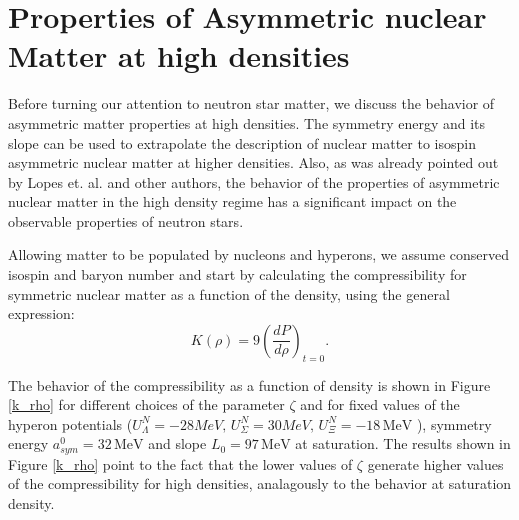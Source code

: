\documentclass[twocolumn,showpacs,aps]{revtex4}
\begin{document}
\section{Properties of Asymmetric nuclear Matter  at high densities} \label{prop_high_section}
Before turning our attention to neutron star matter, we discuss the behavior of asymmetric matter properties at high densities.
The symmetry energy and its slope can be used to extrapolate the description of nuclear matter 
to isospin asymmetric nuclear matter at higher densities.
Also, as was already pointed out by Lopes et. al. \cite{Lopes:2014wda} and other authors, the behavior of the properties
of asymmetric nuclear matter in the high density regime has a significant impact on the observable properties  of neutron stars. 

Allowing matter to be populated by nucleons and hyperons, we assume conserved isospin and baryon number and start by calculating 
the compressibility for symmetric nuclear matter as a function of the density, using the 
general expression:
\begin{equation}
\label{K_rho_eq}
K (\rho)=  9 \left(\frac{dP}{d\rho} \right)_{t=0}.
\end{equation}

The behavior of the compressibility as a function of density is shown in Figure \ref{k_rho} for different
choices of the parameter $\zeta$ and for fixed values of the hyperon potentials 
($U_{\Lambda}^{N}=-28MeV,\,U_{\Sigma}^{N}=30MeV,\,U_{\Xi}^{N}=-18\, \mathrm{MeV}$
 ), 
symmetry energy $a^0_{sym}=32\, \mathrm{MeV}$
  and slope $L_{0}=97\, \mathrm{MeV}$
  at saturation.
The results shown in Figure \ref{k_rho} point to the fact that the lower values of $\zeta$ generate 
higher values of the compressibility for high densities, 
analagously to the behavior at saturation density.
\end{document}
